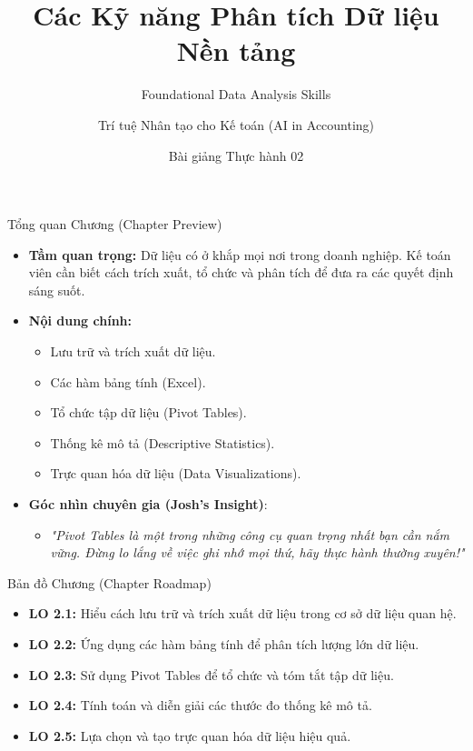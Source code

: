 \documentclass[aspectratio=169,12pt]{beamer}
\title[Thực hành - Chương 2]{Các Kỹ năng Phân tích Dữ liệu Nền tảng}
\subtitle{Foundational Data Analysis Skills}
\author[Giảng viên]{Trí tuệ Nhân tạo cho Kế toán (AI in Accounting)}
\institute[Đại học]{Khoa Kế toán - Kiểm toán}
\date{Bài giảng Thực hành 02}
\begin{document}
\begin{frame}
    \titlepage
\end{frame}

\begin{frame}{Tổng quan Chương (Chapter Preview)}
    \begin{itemize}
        \item \textbf{Tầm quan trọng:} Dữ liệu có ở khắp mọi nơi trong doanh nghiệp. Kế toán viên cần biết cách trích xuất, tổ chức và phân tích để đưa ra các quyết định sáng suốt.
        \item \textbf{Nội dung chính:}
        \begin{itemize}
            \item Lưu trữ và trích xuất dữ liệu.
            \item Các hàm bảng tính (Excel).
            \item Tổ chức tập dữ liệu (Pivot Tables).
            \item Thống kê mô tả (Descriptive Statistics).
            \item Trực quan hóa dữ liệu (Data Visualizations).
        \end{itemize}
        \item \textbf{Góc nhìn chuyên gia (Josh's Insight)}: 
        \begin{itemize}
            \item \textit{"Pivot Tables là một trong những công cụ quan trọng nhất bạn cần nắm vững. Đừng lo lắng về việc ghi nhớ mọi thứ, hãy thực hành thường xuyên!"}
        \end{itemize}
    \end{itemize}
\end{frame}

\begin{frame}{Bản đồ Chương (Chapter Roadmap)}
    \begin{itemize}
        \item \textbf{LO 2.1:} Hiểu cách lưu trữ và trích xuất dữ liệu trong cơ sở dữ liệu quan hệ.
        \item \textbf{LO 2.2:} Ứng dụng các hàm bảng tính để phân tích lượng lớn dữ liệu.
        \item \textbf{LO 2.3:} Sử dụng Pivot Tables để tổ chức và tóm tắt tập dữ liệu.
        \item \textbf{LO 2.4:} Tính toán và diễn giải các thước đo thống kê mô tả.
        \item \textbf{LO 2.5:} Lựa chọn và tạo trực quan hóa dữ liệu hiệu quả.
    \end{itemize}
\end{frame}
\end{document}
